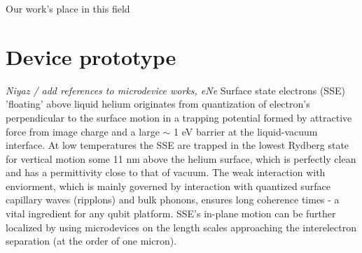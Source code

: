 \documentclass[twocolumn,superscriptaddress,unsortedaddress,
 amsmath,amssymb,
 aps,
]{revtex4-2}
\begin{document}
Our work's place in this field


\section{Device prototype} %
\textit{Niyaz / add references to microdevice works, eNe} Surface state electrons (SSE) 'floating' above liquid helium originates from quantization of electron's perpendicular to the surface motion in a trapping potential formed by attractive force from image charge and a large $\sim$ 1 eV barrier at the liquid-vacuum interface. At low temperatures the SSE are trapped in the lowest Rydberg state for vertical motion some 11 nm above the helium surface, which is perfectly clean and has a permittivity close to that of vacuum. The weak interaction with enviorment, which is mainly governed by interaction with quantized surface capillary waves (ripplons) and bulk phonons, ensures long coherence times - a vital ingredient for any qubit platform. SSE's in-plane motion can be further localized by using microdevices on the length scales approaching the interelectron separation (at the order of one micron).
\end{document}
